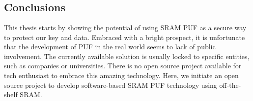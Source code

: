 \chapter{\chapterSix}
\label{chp:6}

\section{Conclusions}
This thesis starts by showing the potential of using SRAM PUF as a secure way to protect our key and data. Embraced with a bright prospect, it is unfortunate that the development of PUF in the real world seems to lack of public involvement. The currently available solution is usually locked to specific entities, such as companies or universities. There is no open source project available for tech enthusiast to embrace this amazing technology. Here, we initiate an open source project to develop software-based SRAM PUF technology using off-the-shelf SRAM.

